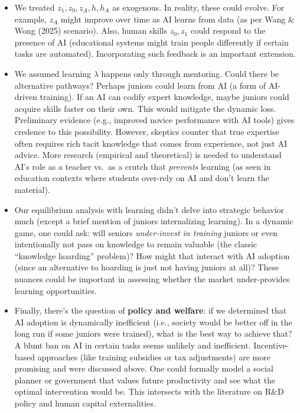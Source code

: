\documentclass[12pt]{article}
\begin{document}
\begin{itemize}
\tightlist
\item
  We treated \(z_1, z_0, z_A, h, h_A\) as exogenous. In reality, these
  could evolve. For example, \(z_A\) might improve over time as AI
  learns from data (as per Wang \& Wong (2025) scenario). Also, human
  skills \(z_0, z_1\) could respond to the presence of AI (educational
  systems might train people differently if certain tasks are
  automated). Incorporating such feedback is an important extension.
\item
  We assumed learning \(\lambda\) happens only through mentoring. Could
  there be alternative pathways? Perhaps juniors could learn from AI (a
  form of AI-driven training). If an AI can codify expert knowledge,
  maybe juniors could acquire skills faster on their own. This would
  mitigate the dynamic loss. Preliminary evidence (e.g., improved novice
  performance with AI tools) gives credence to this possibility.
  However, skeptics counter that true expertise often requires rich
  tacit knowledge that comes from experience, not just AI advice. More
  research (empirical and theoretical) is needed to understand AI's role
  as a teacher vs.~as a crutch that \emph{prevents} learning (as seen in
  education contexts where students over-rely on AI and don't learn the
  material).
\item
  Our equilibrium analysis with learning didn't delve into strategic
  behavior much (except a brief mention of juniors internalizing
  learning). In a dynamic game, one could ask: will seniors
  \emph{under-invest in training} juniors or even intentionally not pass
  on knowledge to remain valuable (the classic ``knowledge hoarding''
  problem)? How might that interact with AI adoption (since an
  alternative to hoarding is just not having juniors at all)? These
  nuances could be important in assessing whether the market
  under-provides learning opportunities.
\item
  Finally, there's the question of \textbf{policy and welfare}: if we
  determined that AI adoption is dynamically inefficient (i.e., society
  would be better off in the long run if some juniors were trained),
  what is the best way to achieve that? A blunt ban on AI in certain
  tasks seems unlikely and inefficient. Incentive-based approaches (like
  training subsidies or tax adjustments) are more promising and were
  discussed above. One could formally model a social planner or
  government that values future productivity and see what the optimal
  intervention would be. This intersects with the literature on R\&D
  policy and human capital externalities.
\end{itemize}
\end{document}
